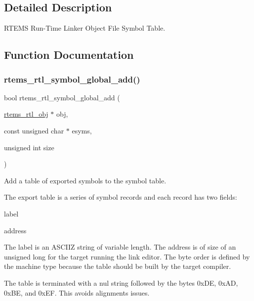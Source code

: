 \subsection{Detailed Description}
R\+T\+E\+MS Run-\/\+Time Linker Object File Symbol Table. 



\subsection{Function Documentation}
\mbox{\label{rtl-sym_8c_acfcaf459050499e3ba535d8f17b1cac7}} 
\subsubsection{\texorpdfstring{rtems\_rtl\_symbol\_global\_add()}{rtems\_rtl\_symbol\_global\_add()}}
{\footnotesize\ttfamily bool rtems\+\_\+rtl\+\_\+symbol\+\_\+global\+\_\+add (\begin{DoxyParamCaption}\item[{\mbox{\hyperlink{structrtems__rtl__obj}{rtems\+\_\+rtl\+\_\+obj}} $\ast$}]{obj,  }\item[{const unsigned char $\ast$}]{esyms,  }\item[{unsigned int}]{size }\end{DoxyParamCaption})}

Add a table of exported symbols to the symbol table.

The export table is a series of symbol records and each record has two fields\+:


\begin{DoxyEnumerate}
\item label
\item address
\end{DoxyEnumerate}

The \textquotesingle{}label\textquotesingle{} is an A\+S\+C\+I\+IZ string of variable length. The address is of size of an unsigned long for the target running the link editor. The byte order is defined by the machine type because the table should be built by the target compiler.

The table is terminated with a nul string followed by the bytes 0x\+DE, 0x\+AD, 0x\+BE, and 0x\+EF. This avoids alignments issues.


